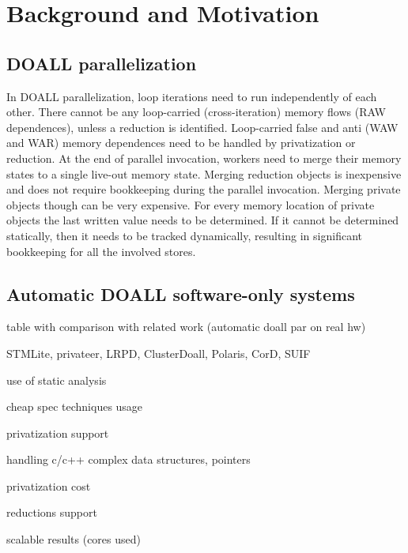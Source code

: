 \section{Background and Motivation}
\label{sec:motivation}

\subsection{DOALL parallelization}

In DOALL parallelization, loop iterations need to run independently of each
other.  There cannot be any loop-carried (cross-iteration) memory flows (RAW
dependences), unless a reduction is identified. Loop-carried false and anti (WAW
and WAR) memory dependences need to be handled by privatization or reduction.
At the end of parallel invocation, workers need to merge their memory states to
a single live-out memory state.  Merging reduction objects is inexpensive and
does not require bookkeeping during the parallel invocation.  Merging private
objects though can be very expensive. For every memory location of private
objects the last written value needs to be determined. If it cannot be
determined statically, then it needs to be tracked dynamically, resulting in
significant bookkeeping for all the involved stores.

\subsection{Automatic DOALL software-only systems}

table with comparison with related work (automatic doall par on real hw)

STMLite, privateer, LRPD, ClusterDoall,
Polaris, CorD, SUIF

use of static analysis

cheap spec techniques usage

privatization support

handling c/c++ complex data structures, pointers

privatization cost

reductions support

scalable results (cores used)


